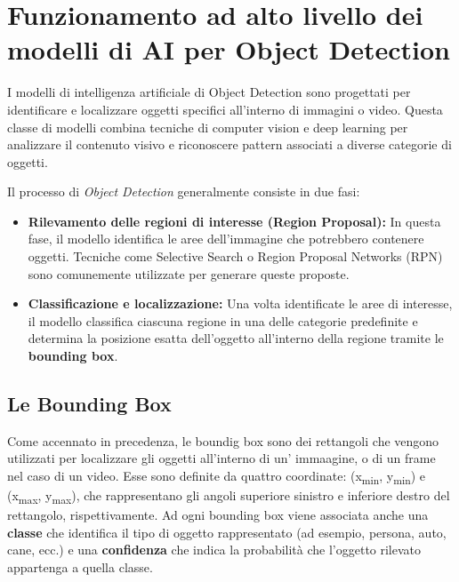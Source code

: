 \section{Funzionamento ad alto livello dei modelli di AI per Object Detection}

I modelli di intelligenza artificiale di Object Detection sono progettati per
identificare e localizzare oggetti specifici all'interno di immagini o video. 
Questa classe di modelli combina tecniche di computer vision e deep learning per
analizzare il contenuto visivo e riconoscere pattern associati a diverse categorie
di oggetti.

Il processo di  \textit{Object Detection} generalmente consiste in due fasi:
\begin{itemize}
    \item \textbf{Rilevamento delle regioni di interesse (Region Proposal):} In questa fase, il modello identifica le aree dell'immagine che potrebbero contenere oggetti. Tecniche come Selective Search o Region Proposal Networks (RPN) sono comunemente utilizzate per generare queste proposte.
    
    \item \textbf{Classificazione e localizzazione:} Una volta identificate le aree di interesse, il modello classifica ciascuna regione in una delle categorie predefinite e determina la posizione esatta dell'oggetto all'interno della regione tramite le \textbf{bounding box}.
\end{itemize}


\subsection{Le Bounding Box}

Come accennato in precedenza, le boundig box sono dei rettangoli che vengono 
utilizzati per localizzare gli oggetti all'interno di un' immaagine, o di un frame
nel caso di un video.
Esse sono definite da quattro coordinate: (x\textsubscript{min}, y\textsubscript{min})
e (x\textsubscript{max}, y\textsubscript{max}), che rappresentano gli angoli superiore
sinistro e inferiore destro del rettangolo, rispettivamente. Ad ogni bounding box
viene associata anche una \textbf{classe} che identifica il tipo di oggetto
rappresentato (ad esempio, persona, auto, cane, ecc.) e una \textbf{confidenza}
che indica la probabilità che l'oggetto rilevato appartenga a quella classe.

